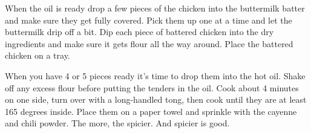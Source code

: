 \begin{IngredientsAndSteps}
{        When the oil is ready drop a few pieces of the chicken into the buttermilk batter and make sure they get fully
        covered. Pick them up one at a time and let the buttermilk drip off a bit. Dip each piece of battered chicken into
        the dry ingredients and make sure it gets flour all the way around. Place the battered chicken on a tray.

        When you have 4 or 5 pieces ready it's time to drop them into the hot oil. Shake off any excess flour before putting
        the tenders in the oil. Cook about 4 minutes on one side, turn over with a long-handled tong, then cook until they are
        at least 165 degrees inside. Place them on a paper towel and sprinkle with the cayenne and chili powder. The more, the
        spicier. And spicier is good.
    }
\end{IngredientsAndSteps}

%
%
%
%
\newpage



